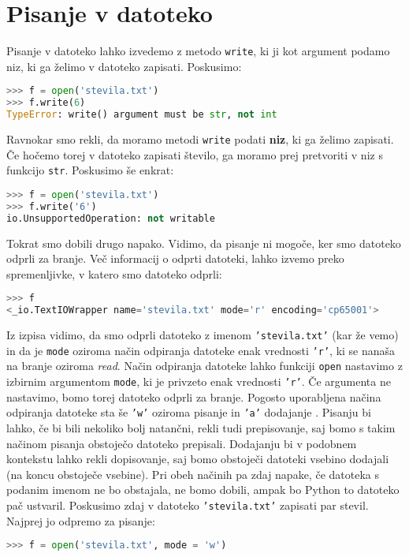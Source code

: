 \section{Pisanje v datoteko}

Pisanje v datoteko lahko izvedemo z metodo \texttt{write}, ki ji kot argument podamo niz, ki ga želimo v datoteko zapisati. Poskusimo:
\begin{lstlisting}[language=Python, showstringspaces=false]
>>> f = open('stevila.txt')
>>> f.write(6)
TypeError: write() argument must be str, not int
\end{lstlisting}
Ravnokar smo rekli, da moramo metodi \texttt{write} podati \textbf{niz}, ki ga želimo zapisati. Če hočemo torej v datoteko zapisati število, ga moramo prej pretvoriti v niz s funkcijo \texttt{str}. Poskusimo še enkrat: 
\begin{lstlisting}[language=Python, showstringspaces=false]
>>> f = open('stevila.txt')
>>> f.write('6')
io.UnsupportedOperation: not writable
\end{lstlisting}
Tokrat smo dobili drugo napako. Vidimo, da pisanje ni mogoče, ker smo datoteko odprli za branje. Več informacij o odprti datoteki, lahko izvemo preko spremenljivke, v katero smo datoteko odprli:
\begin{lstlisting}[language=Python, showstringspaces=false]
>>> f
<_io.TextIOWrapper name='stevila.txt' mode='r' encoding='cp65001'>
\end{lstlisting}
Iz izpisa vidimo, da smo odprli datoteko z imenom \texttt{'stevila.txt'} (kar že vemo) in da je \texttt{mode} oziroma način odpiranja datoteke enak vrednosti \texttt{'r'}, ki se nanaša na branje oziroma \emph{read}. Način odpiranja datoteke lahko funkciji \texttt{open} nastavimo z izbirnim argumentom \texttt{mode}, ki je privzeto enak vrednosti \texttt{'r'}. Če argumenta ne nastavimo, bomo torej datoteko odprli za branje. Pogosto uporabljena načina odpiranja datoteke sta še \texttt{'w'} oziroma pisanje  in \texttt{'a'} dodajanje . Pisanju bi lahko, če bi bili nekoliko bolj natančni, rekli tudi prepisovanje, saj bomo s takim načinom pisanja obstoječo datoteko prepisali. Dodajanju bi v podobnem kontekstu lahko rekli dopisovanje, saj bomo obstoječi datoteki vsebino dodajali (na koncu obstoječe vsebine). Pri obeh načinih pa zdaj napake, če datoteka s podanim imenom ne bo obstajala, ne bomo dobili, ampak bo Python to datoteko pač ustvaril. Poskusimo zdaj v datoteko \texttt{'stevila.txt'} zapisati par stevil. Najprej jo odpremo za pisanje:
\begin{lstlisting}[language=Python, showstringspaces=false]
>>> f = open('stevila.txt', mode = 'w')
\end{lstlisting}
